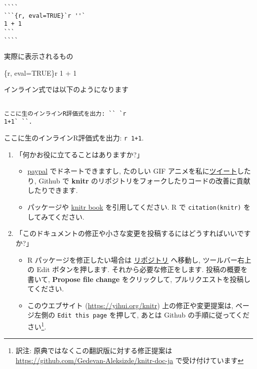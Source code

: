 \documentclass[
  lualatex,ja=standard,jafont=noto-otf]{bxjsreport}
\newenvironment{Shaded}{\begin{snugshade}}{\end{snugshade}}
\newcommand{\NormalTok}[1]{#1}
\providecommand{\tightlist}{%
  \setlength{\itemsep}{0pt}\setlength{\parskip}{0pt}}
\begin{document}
\begin{verbatim}
````
```{r, eval=TRUE}`r ''`
1 + 1
```
````
\end{verbatim}

実際に表示されるもの

\begin{Shaded}
\begin{Highlighting}[numbers=left,,]
\NormalTok{\textasciigrave{}\textasciigrave{}\textasciigrave{}\{r, eval=TRUE\}\textasciigrave{}r \textquotesingle{}\textquotesingle{}\textasciigrave{}}
\NormalTok{1 + 1}
\NormalTok{\textasciigrave{}\textasciigrave{}\textasciigrave{}}
\end{Highlighting}
\end{Shaded}

インライン式では以下のようになります

\begin{verbatim}

ここに生のインラインR評価式を出力: `` `r
1+1` ``.
\end{verbatim}

ここに生のインラインR評価式を出力:
\texttt{\textasciigrave{}r\ 1+1\textasciigrave{}}.

\begin{enumerate}
\def\labelenumi{\arabic{enumi}.}
\setcounter{enumi}{7}
\tightlist
\item
  「何かお役に立てることはありますか?」

  \begin{itemize}
  \tightlist
  \item
    \href{https://paypal.me/YihuiXie}{paypal} でドネートできますし,
    たのしい GIF
    アニメを私に\href{https://twitter.com/xieyihui}{ツイート}したり,
    Github で \textbf{knitr}
    のリポジトリをフォークしたりコードの改善に貢献したりできます.
  \item
    パッケージや \href{http://amzn.com/1498716962}{knitr book}
    を引用してください. R で
    \texttt{citation(\textquotesingle{}knitr\textquotesingle{})}
    をしてみてください.
  \end{itemize}
\item
  「このドキュメントの修正や小さな変更を投稿するにはどうすればいいですか?」

  \begin{itemize}
  \tightlist
  \item
    R パッケージを修正したい場合は
    \href{https://github.com/yihui/knitr}{リポジトリ} へ移動し,
    ツールバー右上の Edit ボタンを押します. それから必要な修正をします.
    投稿の概要を書いて, \textbf{Propose file change} をクリックして,
    プルリクエストを投稿してください.
  \item
    このウエブサイト (\url{https://yihui.org/knitr})
    上の修正や変更提案は, ページ左側の \texttt{Edit\ this\ page}
    を押して, あとは Github の手順に従ってください\footnote{訳注:
      原典ではなくこの翻訳版に対する修正提案は
      \url{https://github.com/Gedevan-Aleksizde/knitr-doc-ja}
      で受け付けています}.
  \end{itemize}
\end{enumerate}
\end{document}
